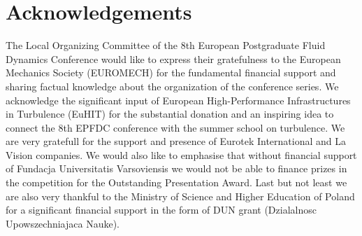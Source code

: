 \section*{Acknowledgements}
The Local Organizing Committee of the 8th European Postgraduate Fluid Dynamics Conference would like to express their gratefulness to the European Mechanics Society (EUROMECH) for the fundamental financial support and sharing factual knowledge about the organization of the conference series. We acknowledge the significant input of European High-Performance Infrastructures in Turbulence (EuHIT) for the substantial donation and an inspiring idea to connect the 8th EPFDC conference with the summer school on turbulence. We are very gratefull for the support and presence of Eurotek International and La Vision companies. We would also like to emphasise that without financial support of Fundacja Universitatis Varsoviensis we would not be able to finance prizes in the competition for the Outstanding Presentation Award. Last but not least we are also very thankful to the Ministry of Science and Higher Education of Poland for a significant financial support in the form of DUN grant (Dzialalnosc Upowszechniajaca Nauke). 

